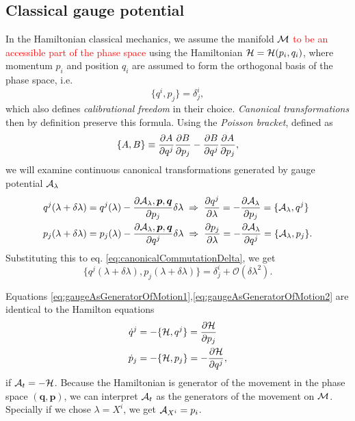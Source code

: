\subsection{Classical gauge potential}
In the Hamiltonian classical mechanics, we assume the manifold $\mathcal{M}$ \textcolor{red}{to be an accessible part of the phase space} using the Hamiltonian $\mathcal{H}=\mathcal{H}(p_i,q_i)$, where momentum $p_i$ and position $q_i$ are assumed to form the orthogonal basis of the phase space, i.e.
\begin{equation}
    \{q^i,p_j\}=\delta^i_j,
    \label{eq:canonicalCommutationDelta}
\end{equation}
which also defines \emph{calibrational freedom} in their choice. \emph{Canonical transformations} then by definition preserve this formula. Using the \emph{Poisson bracket}, defined as
\begin{equation}
    \{A,B\}\equiv \frac{\partial A}{\partial q^j}\frac{\partial B}{\partial p_j}-\frac{\partial B}{\partial q^j}\frac{\partial A}{\partial p_j},
\end{equation}
we will examine continuous canonical transformations generated by gauge potential $\mathcal{A}_\lambda$
\begin{align}
        q^j(\lambda+\delta\lambda)&=q^j(\lambda)-\frac{\partial \mathcal{A}_\lambda,\bm{p},\bm{q}}{\partial p_j}\delta\lambda \;\Rightarrow\; \frac{\partial q^j}{\partial \lambda}=-\frac{\partial \mathcal{A}_\lambda}{\partial p_j}=\{\mathcal{A}_\lambda,q^j\}
        \label{eq:gaugeAsGeneratorOfMotion1}\\
        p_j(\lambda+\delta\lambda)&=p_j(\lambda)-\frac{\partial \mathcal{A}_\lambda,\bm{p},\bm{q}}{\partial q^j}\delta\lambda \;\Rightarrow\; \frac{\partial p_j}{\partial \lambda}=-\frac{\partial \mathcal{A}_\lambda}{\partial q^j}=\{\mathcal{A}_\lambda,p_j\}.
        \label{eq:gaugeAsGeneratorOfMotion2}
\end{align}
Substituting this to eq. \ref{eq:canonicalCommutationDelta}, we get
\begin{equation}
    \{q^j(\lambda+\delta\lambda),p_j(\lambda+\delta\lambda)\}=\delta^i_j + \mathcal{O}(\delta\lambda^2).
\end{equation}
 
Equations \ref{eq:gaugeAsGeneratorOfMotion1},\ref{eq:gaugeAsGeneratorOfMotion2} are identical to the Hamilton equations
\begin{equation}
\begin{split}
    \dot{q}^j&=-\{\mathcal{H},q^j\} = \frac{\partial \mathcal{H}}{\partial p_j}\\
    \dot{p}_j&=-\{\mathcal{H},p_j\} = -\frac{\partial \mathcal{H}}{\partial q^j},
\end{split}
\end{equation}
if $\mathcal{A}_t=-\mathcal{H}$. Because the Hamiltonian is generator of the movement in the phase space $(\bm{q},\bm{p})$, we can interpret $\mathcal{A}_t$ as the generators of the movement on $\mathcal{M}$. Specially if we chose $\lambda=X^i$, we get $\mathcal{A}_{X^i}=p_i$.




